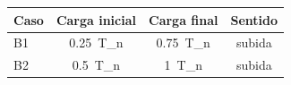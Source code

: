 \begin{tabular}{lccc}
\toprule
Caso & Carga inicial & Carga final & Sentido \\
\midrule
B1 & 0.25~T_n & 0.75~T_n & subida \\
B2 & 0.5~T_n & 1~T_n & subida \\
\bottomrule
\end{tabular}
